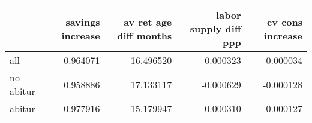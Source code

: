 \begin{tabular}{lrrrr}
\toprule
 & savings increase & av ret age diff months & labor supply diff ppp & cv cons increase \\
\midrule
all & 0.964071 & 16.496520 & -0.000323 & -0.000034 \\
no abitur & 0.958886 & 17.133117 & -0.000629 & -0.000128 \\
abitur & 0.977916 & 15.179947 & 0.000310 & 0.000127 \\
\bottomrule
\end{tabular}
